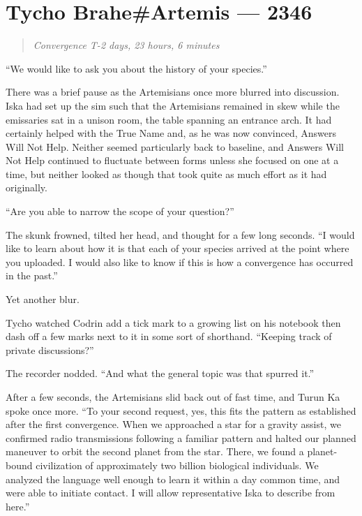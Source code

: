 \hypertarget{tycho-braheartemis-2346}{%
\chapter{Tycho Brahe\#Artemis — 2346}\label{tycho-braheartemis-2346}}

\begin{quote}
\emph{Convergence T-2 days, 23 hours, 6 minutes}
\end{quote}

``We would like to ask you about the history of your species.''

There was a brief pause as the Artemisians once more blurred into discussion. Iska had set up the sim such that the Artemisians remained in skew while the emissaries sat in a unison room, the table spanning an entrance arch. It had certainly helped with the True Name and, as he was now convinced, Answers Will Not Help. Neither seemed particularly back to baseline, and Answers Will Not Help continued to fluctuate between forms unless she focused on one at a time, but neither looked as though that took quite as much effort as it had originally.

``Are you able to narrow the scope of your question?''

The skunk frowned, tilted her head, and thought for a few long seconds. ``I would like to learn about how it is that each of your species arrived at the point where you uploaded. I would also like to know if this is how a convergence has occurred in the past.''

Yet another blur.

Tycho watched Codrin add a tick mark to a growing list on his notebook then dash off a few marks next to it in some sort of shorthand. ``Keeping track of private discussions?''

The recorder nodded. ``And what the general topic was that spurred it.''

After a few seconds, the Artemisians slid back out of fast time, and Turun Ka spoke once more. ``To your second request, yes, this fits the pattern as established after the first convergence. When we approached a star for a gravity assist, we confirmed radio transmissions following a familiar pattern and halted our planned maneuver to orbit the second planet from the star. There, we found a planet-bound civilization of approximately two billion biological individuals. We analyzed the language well enough to learn it within a day common time, and were able to initiate contact. I will allow representative Iska to describe from here.''

